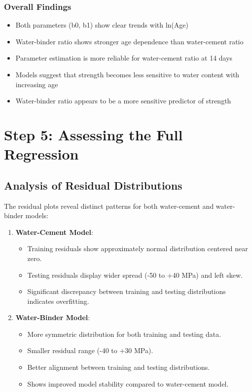\documentclass[a4paper,11pt]{article}
\begin{document}
\subsubsection*{Overall Findings}
\begin{itemize}
    \item Both parameters (b0, b1) show clear trends with ln(Age)
    \item Water-binder ratio shows stronger age dependence than water-cement ratio
    \item Parameter estimation is more reliable for water-cement ratio at 14 days
    \item Models suggest that strength becomes less sensitive to water content with increasing age
    \item Water-binder ratio appears to be a more sensitive predictor of strength
\end{itemize}
 

\section*{Step 5: Assessing the Full Regression}

\subsection*{Analysis of Residual Distributions}

The residual plots reveal distinct patterns for both water-cement and water-binder models:

\begin{enumerate}
    \item \textbf{Water-Cement Model}:
    \begin{itemize}
        \item Training residuals show approximately normal distribution centered near zero.
        \item Testing residuals display wider spread (-50 to +40 MPa) and left skew.
        \item Significant discrepancy between training and testing distributions indicates overfitting.
    \end{itemize}

    \item \textbf{Water-Binder Model}:
    \begin{itemize}
        \item More symmetric distribution for both training and testing data.
        \item Smaller residual range (-40 to +30 MPa).
        \item Better alignment between training and testing distributions.
        \item Shows improved model stability compared to water-cement model.
    \end{itemize}
\end{enumerate}
\end{document}

